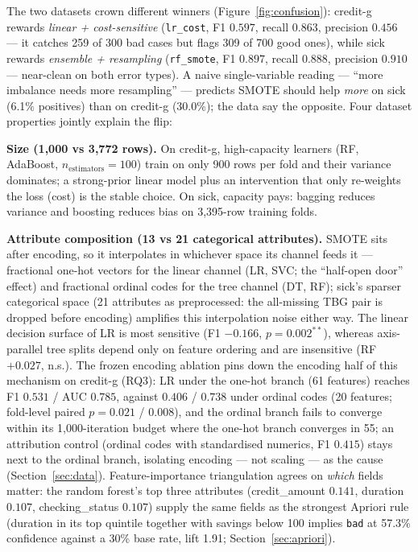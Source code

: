 The two datasets crown different winners (Figure~\ref{fig:confusion}): credit-g rewards \emph{linear + cost-sensitive} (\texttt{lr\_cost}, F1 $0.597$, recall $0.863$, precision $0.456$ --- it catches 259 of 300 bad cases but flags 309 of 700 good ones), while sick rewards \emph{ensemble + resampling} (\texttt{rf\_smote}, F1 $0.897$, recall $0.888$, precision $0.910$ --- near-clean on both error types). A naive single-variable reading --- ``more imbalance needs more resampling'' --- predicts SMOTE should help \emph{more} on sick (6.1\% positives) than on credit-g (30.0\%); the data say the opposite. Four dataset properties jointly explain the flip:

\textbf{Size (1{,}000 vs 3{,}772 rows).} On credit-g, high-capacity learners (RF, AdaBoost, $n_{\mathrm{estimators}}=100$) train on only 900 rows per fold and their variance dominates; a strong-prior linear model plus an intervention that only re-weights the loss (cost) is the stable choice. On sick, capacity pays: bagging reduces variance and boosting reduces bias on 3{,}395-row training folds.

\textbf{Attribute composition (13 vs 21 categorical attributes).} SMOTE sits after encoding, so it interpolates in whichever space its channel feeds it --- fractional one-hot vectors for the linear channel (LR, SVC; the ``half-open door'' effect) and fractional ordinal codes for the tree channel (DT, RF); sick's sparser categorical space (21 attributes as preprocessed: the all-missing TBG pair is dropped before encoding) amplifies this interpolation noise either way. The linear decision surface of LR is most sensitive (F1 $-0.166$, $p=0.002^{**}$), whereas axis-parallel tree splits depend only on feature ordering and are insensitive (RF $+0.027$, n.s.). The frozen encoding ablation pins down the encoding half of this mechanism on credit-g (RQ3): LR under the one-hot branch (61 features) reaches F1 $0.531$ / AUC $0.785$, against $0.406$ / $0.738$ under ordinal codes (20 features; fold-level paired $p=0.021$ / $0.008$), and the ordinal branch fails to converge within its 1{,}000-iteration budget where the one-hot branch converges in 55; an attribution control (ordinal codes with standardised numerics, F1 $0.415$) stays next to the ordinal branch, isolating encoding --- not scaling --- as the cause (Section~\ref{sec:data}). Feature-importance triangulation agrees on \emph{which} fields matter: the random forest's top three attributes (credit\_amount $0.141$, duration $0.107$, checking\_status $0.107$) supply the same fields as the strongest Apriori rule (duration in its top quintile together with savings below 100 implies \texttt{bad} at 57.3\% confidence against a 30\% base rate, lift 1.91; Section~\ref{sec:apriori}).

